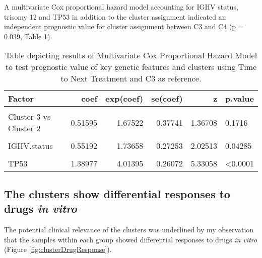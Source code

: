 \documentclass[11pt, a4paper, twosided]{book}
\begin{document}
A multivariate Cox proportional hazard model accounting for IGHV status, trisomy 12 and TP53 in addition to the cluster assignment indicated an independent prognostic value for cluster assignment between C3 and C4 (p = 0.039, Table \ref{tab:clusterCox}).


\begin{table}

\caption{\label{tab:clusterCox}Table depicting results of Multivariate Cox Proportional Hazard Model to test prognostic value of key genetic features and clusters using Time to Next Treatment and C3 as reference. }
\centering
\fontsize{7}{9}\selectfont
\begin{tabular}[t]{l|r|r|r|r|l}
\hline
Factor & coef & exp(coef) & se(coef) & z & p.value\\
\hline
\cellcolor[HTML]{E2E868}{Cluster 3 vs Cluster 1} & \cellcolor[HTML]{E2E868}{-0.03979} & \cellcolor[HTML]{E2E868}{0.96099} & \cellcolor[HTML]{E2E868}{0.29813} & \cellcolor[HTML]{E2E868}{-0.13347} & \cellcolor[HTML]{E2E868}{0.89382}\\
\hline
Cluster 3 vs Cluster 2 & 0.51595 & 1.67522 & 0.37741 & 1.36708 & 0.1716\\
\hline
\cellcolor[HTML]{E2E868}{Cluster 3 vs Cluster 4} & \cellcolor[HTML]{E2E868}{-0.82011} & \cellcolor[HTML]{E2E868}{0.44038} & \cellcolor[HTML]{E2E868}{0.39760} & \cellcolor[HTML]{E2E868}{-2.06267} & \cellcolor[HTML]{E2E868}{0.03914}\\
\hline
IGHV.status & 0.55192 & 1.73658 & 0.27253 & 2.02513 & 0.04285\\
\hline
\cellcolor[HTML]{E2E868}{trisomy 12} & \cellcolor[HTML]{E2E868}{-0.13357} & \cellcolor[HTML]{E2E868}{0.87496} & \cellcolor[HTML]{E2E868}{0.35617} & \cellcolor[HTML]{E2E868}{-0.37503} & \cellcolor[HTML]{E2E868}{0.70764}\\
\hline
TP53 & 1.38977 & 4.01395 & 0.26072 & 5.33058 & <0.0001\\
\hline
\end{tabular}
\end{table}
\hypertarget{the-clusters-show-differential-responses-to-drugs-in-vitro}{%
\subsection{\texorpdfstring{The clusters show differential responses to drugs \emph{in vitro}}{The clusters show differential responses to drugs in vitro}}\label{the-clusters-show-differential-responses-to-drugs-in-vitro}}

The potential clinical relevance of the clusters was underlined by my observation that the samples within each group showed differential responses to drugs \emph{in vitro} (Figure \ref{fig:clusterDrugResponse}).
\end{document}
